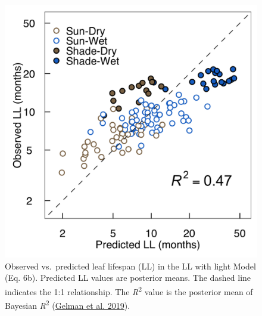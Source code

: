 \documentclass[
  12pt,
]{article}
\providecommand{\DIFaddbeginFL}{} %
\providecommand{\DIFaddendFL}{} %
\providecommand{\DIFdelbeginFL}{} %
\providecommand{\DIFdelendFL}{} %
\newcommand{\DIFscaledelfig}{0.5}
\newlength{\DIFdelgraphicswidth} %
\newlength{\DIFdelgraphicsheight} %
\newcommand{\DIFaddincludegraphics}[2][]{{\color{blue}\fbox{\DIFOincludegraphics[#1]{#2}}}} %
\newcommand{\DIFdelincludegraphics}[2][]{%
\sbox{\DIFdelgraphicsbox}{\DIFOincludegraphics[#1]{#2}}%
\settoboxwidth{\DIFdelgraphicswidth}{\DIFdelgraphicsbox} %
\settoboxtotalheight{\DIFdelgraphicsheight}{\DIFdelgraphicsbox} %
\scalebox{\DIFscaledelfig}{%
\parbox[b]{\DIFdelgraphicswidth}{\usebox{\DIFdelgraphicsbox}\\[-\baselineskip] \rule{\DIFdelgraphicswidth}{0em}}\llap{\resizebox{\DIFdelgraphicswidth}{\DIFdelgraphicsheight}{%
\setlength{\unitlength}{\DIFdelgraphicswidth}%
\begin{picture}(1,1)%
\thicklines\linethickness{2pt} %
{\color[rgb]{1,0,0}\put(0,0){\framebox(1,1){}}}%
{\color[rgb]{1,0,0}\put(0,0){\line( 1,1){1}}}%
{\color[rgb]{1,0,0}\put(0,1){\line(1,-1){1}}}%
\end{picture}%
}\hspace*{3pt}}} %
} %
\DeclareRobustCommand{\DIFaddbeginFL}{\DIFOaddbeginFL \let\includegraphics\DIFaddincludegraphics} %
\DeclareRobustCommand{\DIFaddendFL}{\DIFOaddendFL \let\includegraphics\DIFOincludegraphics} %
\DeclareRobustCommand{\DIFdelbeginFL}{\DIFOdelbeginFL \let\includegraphics\DIFdelincludegraphics} %
\DeclareRobustCommand{\DIFdelendFL}{\DIFOaddendFL \let\includegraphics\DIFOincludegraphics} %
\begin{document}
\begin{figure}
\DIFdelbeginFL %
\DIFdelendFL \DIFaddbeginFL \hypertarget{fig:LLplt}{%
\centering
\includegraphics{../figs/LL_plot.png}
\caption{Observed vs.~predicted leaf lifespan (LL) in the LL with light Model (Eq. 6b).
Predicted LL values are posterior means.
The dashed line indicates the 1:1 relationship.
The \emph{R}\textsuperscript{2} value is the posterior mean of Bayesian \emph{R}\textsuperscript{2} (\protect\hyperlink{ref-Gelman2019}{Gelman et al. 2019}).}\label{fig:LLplt}
}
\DIFaddendFL \end{figure}

\newpage
\end{document}
